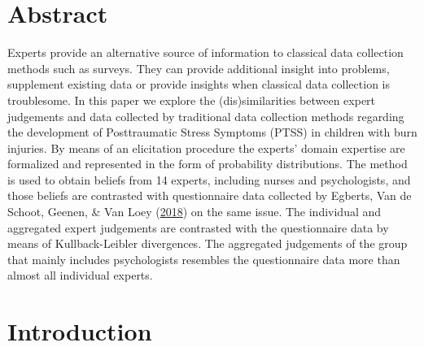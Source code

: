 \documentclass[openright,titlepage,12pt,a4paper]{book}
\begin{document}
\hypertarget{abstract-4}{%
\section*{Abstract}\label{abstract-4}}

\small

Experts provide an alternative source of information to classical data collection methods such as surveys. They can provide additional insight into problems, supplement existing data or provide insights when classical data collection is troublesome. In this paper we explore the (dis)similarities between expert judgements and data collected by traditional data collection methods regarding the development of Posttraumatic Stress Symptoms (PTSS) in children with burn injuries. By means of an elicitation procedure the experts' domain expertise are formalized and represented in the form of probability distributions. The method is used to obtain beliefs from 14 experts, including nurses and psychologists, and those beliefs are contrasted with questionnaire data collected by Egberts, Van de Schoot, Geenen, \& Van Loey (\protect\hyperlink{ref-egberts_mother_2018}{2018}) on the same issue. The individual and aggregated expert judgements are contrasted with the questionnaire data by means of Kullback-Leibler divergences. The aggregated judgements of the group that mainly includes psychologists resembles the questionnaire data more than almost all individual experts.

\normalsize
\newpage

\hypertarget{ch06introduction}{%
\section{Introduction}\label{ch06introduction}}
\end{document}

